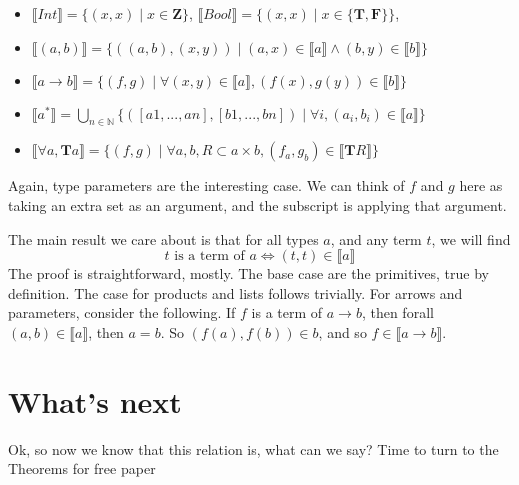 \documentclass[12pt]{article}
\newcommand{\llb}{\llbracket}
\newcommand{\rrb}{\rrbracket}
\begin{document}
\begin{itemize}
\item $ \llb Int \rrb  = \{(x,x) \;|\; x \in \mathbf{Z}\}$, $ \llb Bool \rrb  = \{(x,x) \;|\; x \in \{\mathbf{T, F}\}\}$, 
\item $ \llb (a,b) \rrb  = \{ ((a,b), (x,y)) \;|\; (a,x) \in \llb a \rrb \land (b,y) \in \llb b \rrb \}$ 
\item $ \llb a \rightarrow b \rrb  = \{ (f,g) \; | \; 
    \forall (x,y) \in \llb a \rrb, (f(x), g(y)) \in  \llb b \rrb \}$ 
\item $ \llb a ^ * \rrb  =  \bigcup_{n \in \mathbb{N}} \{([a1,...,an],[b1,...,bn]) \;|\; \forall i, (a_i, b_i) \in \llb a \rrb \}$
\item $ \llb \forall a, \mathbf{T} a \rrb = \{(f,g) \; | \;
    \forall a,b, R \subset a \times b, 
      (f_a, g_{b}) \in  \llb \mathbf{T} R \rrb \} $
\end{itemize}
Again, type parameters are the interesting case.
We can think of $f$ and $g$ here as taking an extra set as an argument,
and the subscript is applying that argument.

The main result we care about is that for all types $a$, and any term $t$, we will find 
\[
t \text{ is a term of } a \iff (t,t) \in \llb a \rrb
\]
The proof is straightforward, mostly.
The base case are the primitives, true by definition.
The case for products and lists follows trivially. 
For arrows and parameters, consider the following. If $f$ is a term of $a \rightarrow b$, then forall $(a,b) \in \llb a \rrb$, then $a = b$. So $(f(a), f(b)) \in b$, and so $f \in \llb a \rightarrow b \rrb$. 


\section{What's next}
Ok, so now we know that this relation is, what can we say?
Time to turn to the Theorems for free paper
\end{document}
